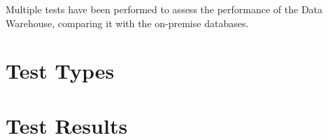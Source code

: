Multiple tests have been performed to assess the performance of the Data Warehouse, comparing it with the on-premise databases. 

\section{Test Types}
    
\section{Test Results}
    
